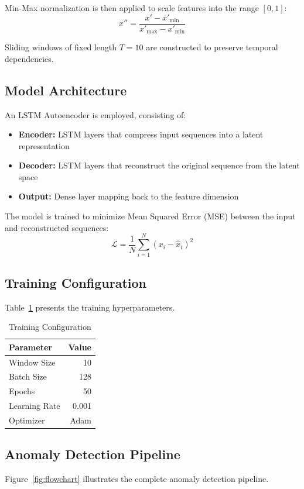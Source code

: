 \documentclass[conference]{IEEEtran}
\begin{document}
Min-Max normalization is then applied to scale features into the range $[0, 1]$:
\begin{equation}
x'' = \frac{x' - x'_{\min}}{x'_{\max} - x'_{\min}}
\end{equation}

Sliding windows of fixed length $T=10$ are constructed to preserve temporal dependencies.

\subsection{Model Architecture}
An LSTM Autoencoder is employed, consisting of:
\begin{itemize}
    \item \textbf{Encoder:} LSTM layers that compress input sequences into a latent representation
    \item \textbf{Decoder:} LSTM layers that reconstruct the original sequence from the latent space
    \item \textbf{Output:} Dense layer mapping back to the feature dimension
\end{itemize}

The model is trained to minimize Mean Squared Error (MSE) between the input and reconstructed sequences:
\begin{equation}
\mathcal{L} = \frac{1}{N} \sum_{i=1}^{N} (x_i - \hat{x}_i)^2
\end{equation}

\subsection{Training Configuration}
Table~\ref{tab:config} presents the training hyperparameters.

\begin{table}[H]
\caption{Training Configuration}
\centering
\begin{tabular}{|l|r|}
\hline
\textbf{Parameter} & \textbf{Value} \\
\hline
Window Size & 10 \\
Batch Size & 128 \\
Epochs & 50 \\
Learning Rate & 0.001 \\
Optimizer & Adam \\
\hline
\end{tabular}
\label{tab:config}
\end{table}

\subsection{Anomaly Detection Pipeline}
Figure~\ref{fig:flowchart} illustrates the complete anomaly detection pipeline.
\end{document}
